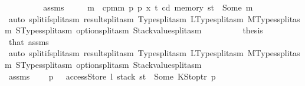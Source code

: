 \begin{isabellebody}
\ \ \ \ \ \ \isamarkupfalse%
\ \isamarkupfalse%
\ assms\ {}\ {}{}\ {}\ \isamarkupfalse%
\ m\ \ {\isachardoublequoteopen}cpm{}m\ p\ p{\isacharprime}{\kern0pt}\ x\ t\ cd\ {\isacharparenleft}{\kern0pt}memory\ st{\isacharparenright}{\kern0pt}\ {\isacharequal}{\kern0pt}\ Some\ m{\isachardoublequoteclose}\isanewline
\ \ \ \ \ \ \ \ \isamarkupfalse%
\ {\isacharparenleft}{\kern0pt}auto\ split{\isacharcolon}{\kern0pt}if{\isacharunderscore}{\kern0pt}split{\isacharunderscore}{\kern0pt}asm\ result{\isachardot}{\kern0pt}split{\isacharunderscore}{\kern0pt}asm\ Type{\isachardot}{\kern0pt}split{\isacharunderscore}{\kern0pt}asm\ LType{\isachardot}{\kern0pt}split{\isacharunderscore}{\kern0pt}asm\ MTypes{\isachardot}{\kern0pt}split{\isacharunderscore}{\kern0pt}asm\ STypes{\isachardot}{\kern0pt}split{\isacharunderscore}{\kern0pt}asm\ option{\isachardot}{\kern0pt}split{\isacharunderscore}{\kern0pt}asm\ Stackvalue{\isachardot}{\kern0pt}split{\isacharunderscore}{\kern0pt}asm{\isacharparenright}{\kern0pt}\isanewline
\ \ \ \ \ \ \isamarkupfalse%
\ \isamarkupfalse%
\ {\isacharquery}{\kern0pt}thesis\ \isamarkupfalse%
\ that{\isacharparenleft}{\kern0pt}{}{\isacharparenright}{\kern0pt}\ assms\ {}\ {}{}\isanewline
\ \ \ \ \ \ \ \ \isamarkupfalse%
\ {\isacharparenleft}{\kern0pt}auto\ split{\isacharcolon}{\kern0pt}if{\isacharunderscore}{\kern0pt}split{\isacharunderscore}{\kern0pt}asm\ result{\isachardot}{\kern0pt}split{\isacharunderscore}{\kern0pt}asm\ Type{\isachardot}{\kern0pt}split{\isacharunderscore}{\kern0pt}asm\ LType{\isachardot}{\kern0pt}split{\isacharunderscore}{\kern0pt}asm\ MTypes{\isachardot}{\kern0pt}split{\isacharunderscore}{\kern0pt}asm\ STypes{\isachardot}{\kern0pt}split{\isacharunderscore}{\kern0pt}asm\ option{\isachardot}{\kern0pt}split{\isacharunderscore}{\kern0pt}asm\ Stackvalue{\isachardot}{\kern0pt}split{\isacharunderscore}{\kern0pt}asm{\isacharparenright}{\kern0pt}\isanewline
\ \ \ \ \isamarkupfalse%
\isanewline
\ \ \ \ \ \ \isamarkupfalse%
\ {}{}\isanewline
\ \ \ \ \ \ \isamarkupfalse%
\ \isamarkupfalse%
\ assms\ {}\ {}{}\ \isamarkupfalse%
\ p{\isacharprime}{\kern0pt}\ \ {}{\isacharcolon}{\kern0pt}\ {\isachardoublequoteopen}accessStore\ l\ {\isacharparenleft}{\kern0pt}stack\ st{\isacharparenright}{\kern0pt}\ {\isacharequal}{\kern0pt}\ Some\ {\isacharparenleft}{\kern0pt}KStoptr\ p{\isacharprime}{\kern0pt}{\isacharparenright}{\kern0pt}{\isachardoublequoteclose}\isanewline

\end{isabellebody}
